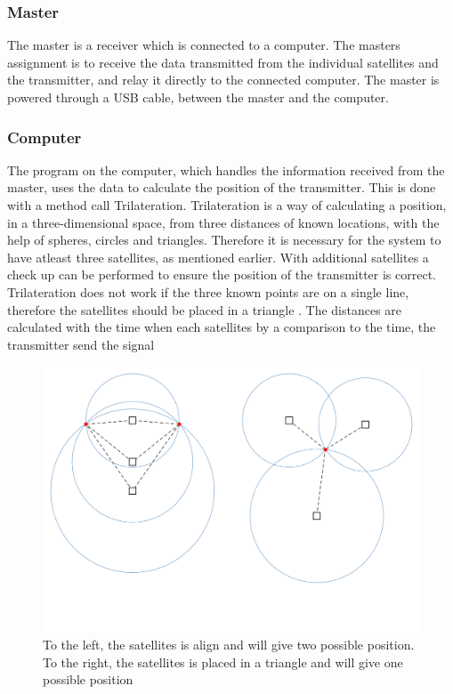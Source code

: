 \subsubsection{Master}
The master is a receiver which is connected to a computer. The masters assignment is to receive the data transmitted from the individual satellites and the transmitter, and relay it directly to the connected computer. The master is powered through a USB cable, between the master and the computer.\\

\subsubsection{Computer}
The program on the computer, which handles the information received from the master, uses the data to calculate the position of the transmitter. This is done with a method call Trilateration. Trilateration is a way of calculating a position, in a three-dimensional space, from three distances of known locations, with the help of spheres, circles and triangles. Therefore it is necessary for the system to have atleast three satellites, as mentioned earlier.  With additional satellites a check up can be performed to ensure the position of the transmitter is correct. Trilateration does not work if the three known points are on a single line, therefore the satellites should be placed in a triangle . The distances are calculated with the time when each satellites by a comparison to the time, the transmitter send the signal

\begin{figure}[H]
	\centering
	\includegraphics[scale=0.5]{figures/GoT_SingleVsTriangle.pdf}
	\caption{To the left, the satellites is align and will give two possible position. To the right, the satellites is placed in a triangle and will give one possible position}
	\label{fig:GoTTriVSLine}
\end{figure}

